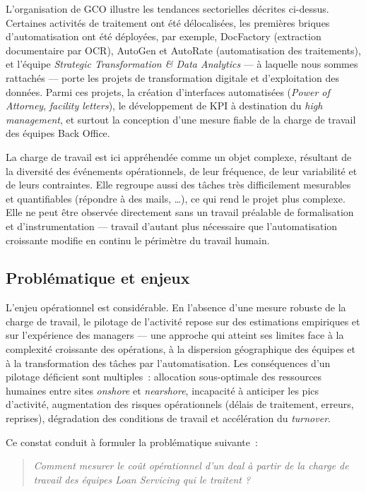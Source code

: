 L'organisation de GCO illustre les tendances sectorielles décrites ci-dessus. Certaines activités de traitement ont été délocalisées, les premières briques d'automatisation ont été déployées, par exemple, DocFactory (extraction documentaire par OCR), AutoGen et AutoRate (automatisation des
traitements), et l'équipe \textit{Strategic Transformation \& Data Analytics} --- à laquelle nous sommes rattachés --- porte les projets de transformation digitale et d'exploitation des données. Parmi ces projets, la création d'interfaces automatisées (\textit{Power of Attorney}, \textit{facility letters}), le développement de KPI à destination du \textit{high management}, et surtout la conception d'une mesure fiable de la charge de travail des équipes Back Office.

La charge de travail est ici appréhendée comme un objet complexe, résultant de la diversité des événements opérationnels, de leur fréquence, de leur variabilité et de leurs contraintes. Elle regroupe aussi des tâches très difficilement mesurables et quantifiables (répondre à des mails, \ldots), ce qui rend le projet plus complexe. Elle ne peut être observée directement sans un travail préalable de formalisation et d'instrumentation --- travail d'autant plus nécessaire que l'automatisation croissante modifie en continu le périmètre du travail humain.

\subsection*{Problématique et enjeux}

L'enjeu opérationnel est considérable. En l'absence d'une mesure robuste de la charge de travail, le pilotage de l'activité repose sur des estimations empiriques et sur l'expérience des managers --- une approche qui atteint ses limites face à la complexité croissante des opérations, à la dispersion géographique des équipes et à la transformation des tâches par l'automatisation. Les conséquences d'un pilotage déficient sont multiples~: allocation sous-optimale des ressources humaines entre sites \textit{onshore} et \textit{nearshore}, incapacité à anticiper les pics d'activité, augmentation des risques opérationnels (délais de traitement, erreurs, reprises), dégradation des conditions de travail et accélération du \textit{turnover}.

Ce constat conduit à formuler la problématique suivante~:

\begin{quote}
\textit{Comment mesurer le coût opérationnel d'un deal à partir de la charge de travail des équipes Loan Servicing qui le traitent ?}
\end{quote}

